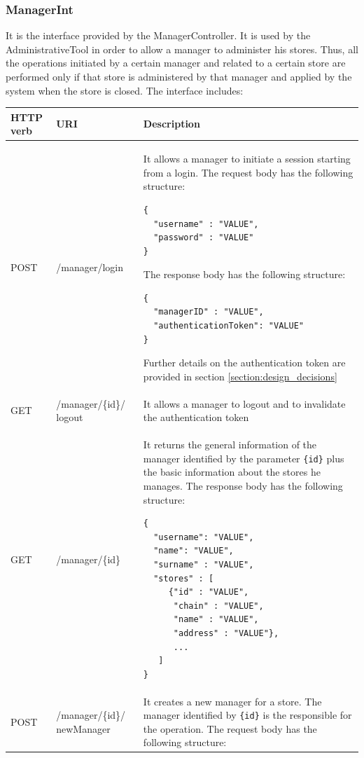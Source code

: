 \documentclass[a4paper,oneside,11pt]{book}
\begin{document}
    \subsubsection{ManagerInt}
    It is the interface provided by the ManagerController. It is used by the AdministrativeTool in order to allow a manager to administer his stores. Thus, all the operations initiated by a certain manager and related to a certain store are performed only if that store is administered by that manager and applied by the system when the store is closed. The interface includes:
    \begin{longtable}[c] { |>{\centering\arraybackslash}P{0.11\textwidth}|>{\centering\arraybackslash\ttfamily}H{0.23\textwidth}|H{0.50\textwidth}| }
        \hline
        \textbf{HTTP verb} & \textrm{\textbf{URI}} & \textbf{\textbf{Description}} \\ \hline
        POST & /manager/login & It allows a manager to initiate a session starting from a login. The request body has the following structure: 
        \begin{lstlisting}[language=jsonDD]
{
  "username" : "VALUE",
  "password" : "VALUE"
}
        \end{lstlisting}
        The response body has the following structure:
        \begin{lstlisting}[language=jsonDD]
{
  "managerID" : "VALUE",
  "authenticationToken": "VALUE"
}
        \end{lstlisting}
        Further details on the authentication token are provided in section \ref{section:design_decisions} \\ \hline
        GET & /manager/\{id\}/ logout & It allows a manager to logout and to invalidate the authentication token \\ \hline
        GET & /manager/\{id\} & It returns the general information of the manager identified by the parameter \texttt{\{id\}} plus the basic information about the stores he manages. The response body has the following structure:
        \begin{lstlisting}[language=jsonDD]
{
  "username": "VALUE",
  "name": "VALUE",
  "surname" : "VALUE",
  "stores" : [
     {"id" : "VALUE",
      "chain" : "VALUE",
      "name" : "VALUE",
      "address" : "VALUE"}, 
      ...
   ]
}
        \end{lstlisting} \\ \hline
        POST & /manager/\{id\}/ newManager & It creates a new manager for a store. The manager identified by \texttt{\{id\}} is the responsible for the operation. The request body has the following structure:

\end{longtable}
\end{document}
